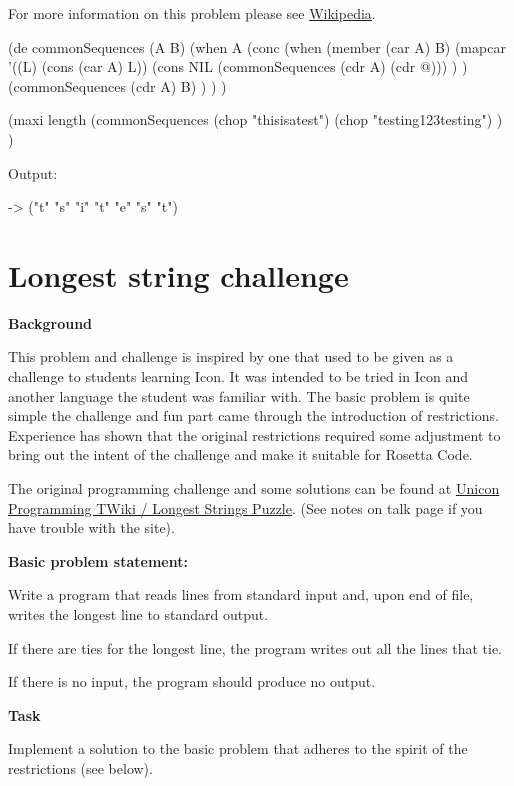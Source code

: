 \begin{itemize}
For more information on this problem please see
\href{http://en.wikipedia.org/wiki/Longest\_common\_subsequence\_problem}{Wikipedia}.

\begin{wideverbatim}

(de commonSequences (A B)
   (when A
      (conc
         (when (member (car A) B)
            (mapcar '((L) (cons (car A) L))
               (cons NIL (commonSequences (cdr A) (cdr @))) ) )
         (commonSequences (cdr A) B) ) ) )

(maxi length
   (commonSequences
      (chop "thisisatest")
      (chop "testing123testing") ) )

Output:

-> ("t" "s" "i" "t" "e" "s" "t")

\end{wideverbatim}

\pagebreak{}
\section*{Longest string challenge}

\textbf{Background}

This problem and challenge is inspired by one that used to be given as a
challenge to students learning Icon. It was intended to be tried in Icon
and another language the student was familiar with. The basic problem is
quite simple the challenge and fun part came through the introduction of
restrictions. Experience has shown that the original restrictions
required some adjustment to bring out the intent of the challenge and
make it suitable for Rosetta Code.

The original programming challenge and some solutions can be found at
\href{https://tapestry.tucson.az.us/twiki/bin/view/Main/LongestStringsPuzzle}{Unicon
Programming TWiki / Longest Strings Puzzle}. (See notes on talk page if
you have trouble with the site).

\textbf{Basic problem statement:}

Write a program that reads lines from standard input and, upon end of
file, writes the longest line to standard output.

If there are ties for the longest line, the program writes out all the
lines that tie.

If there is no input, the program should produce no output.

\textbf{Task}

Implement a solution to the basic problem that adheres to the spirit of
the restrictions (see below).


\end{itemize}
